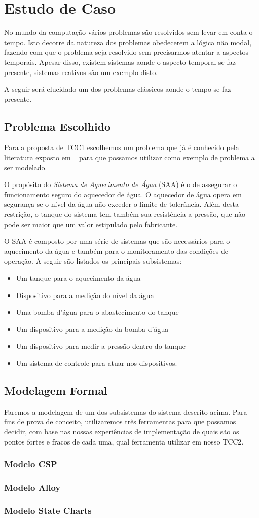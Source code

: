 \section{Estudo de Caso}
No mundo da computação vários problemas são resolvidos sem levar em conta o tempo.
Isto decorre da natureza dos problemas obedecerem a lógica não modal, fazendo com que o
problema seja resolvido sem precisarmos atentar a aspectos temporais. Apesar disso,
existem sistemas aonde o aspecto temporal se faz presente, sistemas reativos são um exemplo disto.

A seguir será elucidado um dos problemas clássicos aonde o tempo se faz presente.
\subsection{Problema Escolhido}
Para a proposta de TCC1 escolhemos um problema que já é conhecido pela literatura exposto
em ~\cite{opac-b1092561} para que possamos utilizar como exemplo de problema a ser modelado.

O propósito do \textit{Sistema de Aquecimento de Água} (SAA) é o de assegurar o funcionamento
seguro do aquecedor de água. O aquecedor de água opera em segurança se o nível da água
não exceder o limite de tolerância. Além desta restrição, o tanque do sistema tem também
sua resistência a pressão, que não pode ser maior que um valor estipulado pelo fabricante.

O SAA é composto por uma série de sistemas que são necessários para o aquecimento da água e também
para o monitoramento das condições de operação. A seguir são listados os principais subsistemas:
\begin{itemize}
\item Um tanque para o aquecimento da água
\item Dispositivo para a medição do nível da água
\item Uma bomba d'água para o abastecimento do tanque
\item Um dispositivo para a medição da bomba d'água
\item Um dispositivo para medir a pressão dentro do tanque
\item Um sistema de controle para atuar nos dispositivos.
\end{itemize}

\subsection{Modelagem Formal}
Faremos a modelagem de um dos subsistemas do sistema descrito acima.
Para fins de prova de conceito, utilizaremos três ferramentas para que possamos decidir, 
com base nas nossas experiências de implementação de quais são os pontos fortes e fracos de cada uma,
qual ferramenta utilizar em nosso TCC2.
\subsubsection{Modelo CSP}
\subsubsection{Modelo Alloy}
\subsubsection{Modelo State Charts}
